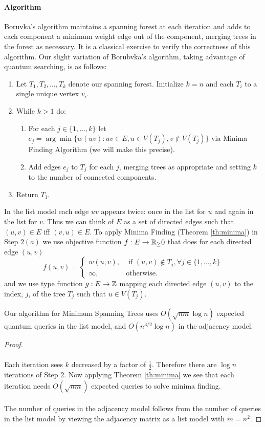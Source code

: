 \paragraph{Algorithm}
Boruvka's algorithm maintains a spanning forest at each iteration and adds to each component a minimum weight edge out of the component, merging trees in the forest as necessary. It is a classical exercise to verify the correctness of this algorithm. Our slight variation of Borubvka's algorithm, taking advantage of quantum searching, is as follows:
\begin{enumerate}
\item Let $T_1, T_2, \dots, T_k$ denote our spanning forest. Initialize $k= n$ and each $T_i$ to a single unique vertex $v_i$.
\item While $k >1$ do:
	\begin{enumerate}
	\item For each $j \in \{1, \dots, k\}$ let $e_j = \arg\min\{w(uv): uv \in E, u \in V(T_j), v \not\in V(T_j)\}$ via Minima Finding Algorithm (we will make this precise). 
	\item Add edges $e_j$ to $T_j$ for each $j$, merging trees as appropriate and setting $k$ to the number of connected components.
	\end{enumerate}
\item Return $T_1$.
\end{enumerate}
In the list model each edge $uv$ appears twice: once in the list for $u$ and again in the list for $v$. Thus we can think of $E$ as a set of directed edges such that $(u,v) \in E$ iff $(v,u) \in E$. To apply Minima Finding (Theorem \ref{th:minima}) in Step $2(a)$ we use objective function $f: E \rightarrow \mathbb{R}_\geq 0$ that does for each directed edge $(u,v)$
$$f(u,v) = \begin{cases}
w(u,v), &\text{ if $(u,v) \not\in T_j, \forall j\in \{1,\dots, k\}$} \\
\infty, &\text{otherwise}.
\end{cases}$$
and we use type function $g: E\rightarrow \mathbb{Z}$ mapping each directed edge $(u,v)$ to the index, $j$, of the tree $T_j$ such that $u \in V(T_j)$.
\begin{theorem}
Our algorithm for Minimum Spanning Trees uses $O(\sqrt{nm}\log n)$ expected quantum queries in the list model, and $O(n^{3/2}\log n)$ in the adjacency model.
\end{theorem}
\begin{proof}
\paragraph{}
Each iteration sees $k$ decreased by a factor of $\frac{1}{2}$. Therefore there are $\log n$ iterations of Step $2$. Now applying Theorem \ref{th:minima} we see that each iteration needs $O(\sqrt{nm})$ expected queries to solve minima finding.
\paragraph{}
The number of queries in the adjacency model follows from the number of queries in the list model by viewing the adjacency matrix as a list model with $m = n^2$.
\end{proof}
